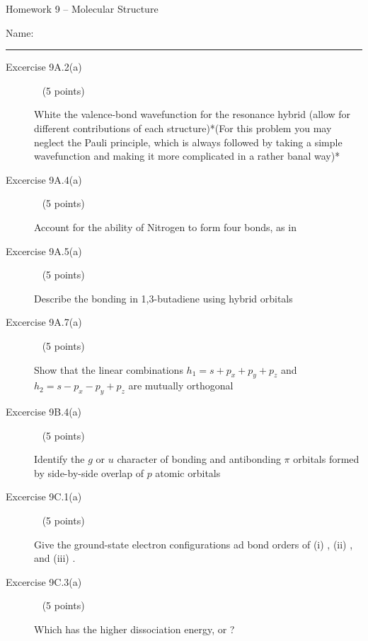 \documentclass[10pt, letterpaper]{memoir}
\begin{document}
\begin{center}
	{\large Homework 9 -- Molecular Structure}
\end{center}

Name: \rule[-.1mm]{15em}{0.1pt}

\begin{description}
	\item [Excercise 9A.2(a)] ~ (5 points)
	
	White the valence-bond wavefunction for the resonance hybrid  (allow for different contributions of each structure)*(For this problem you may neglect the Pauli principle, which is always followed by taking a simple wavefunction and making it more complicated in a rather banal way)*
	
	
	\vspace{9em}
	\item [Excercise 9A.4(a)] ~ (5 points)
	
	Account for the ability of Nitrogen to form four bonds, as in 
	
	\vspace{9em}
	\item [Excercise 9A.5(a)] ~ (5 points)
	
	Describe the bonding in 1,3-butadiene using hybrid orbitals
	
	\vspace{9em}
	\item [Excercise 9A.7(a)] ~ (5 points)
	
	Show that the linear combinations $h_1=s+p_x+p_y+p_z$ and $h_2=s-p_x-p_y+p_z$ are mutually orthogonal
	
	\vspace{15em}
	\item [Excercise 9B.4(a)] ~ (5 points)
	
	Identify the $g$ or $u$ character of bonding and antibonding $\pi$ orbitals formed by side-by-side overlap of $p$ atomic orbitals
	
	\vspace{10em}
	\item [Excercise 9C.1(a)] ~ (5 points)
	
	Give the ground-state electron configurations ad bond orders of (i) , (ii) , and (iii) .
	
	\vspace{22em}
	\item [Excercise 9C.3(a)] ~ (5 points)
	
	Which has the higher dissociation energy,  or ?
	

\end{description}
\end{document}
